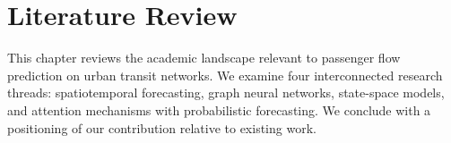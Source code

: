 %
%
\chapter{Literature Review}
\label{chap:litreview}
\setlength{\parskip}{1em}

This chapter reviews the academic landscape relevant to passenger flow prediction on urban transit networks. We examine four interconnected research threads: spatiotemporal forecasting, graph neural networks, state-space models, and attention mechanisms with probabilistic forecasting. We conclude with a positioning of our contribution relative to existing work.
